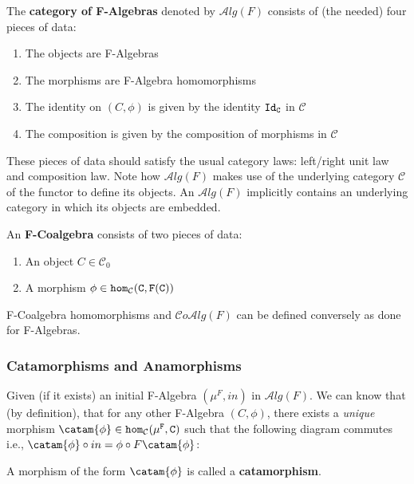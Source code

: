 \newcommand{\alg}[1]{\mathcal{A}lg(#1)}
\newcommand{\coalg}[1]{\mathcal{C}o\mathcal{A}lg(#1)}

The \textbf{category of F-Algebras} denoted by $\alg{F}$ consists of (the needed) four pieces of data:
\begin{enumerate}
    \item The objects are F-Algebras
    \item The morphisms are F-Algebra homomorphisms
    \item The identity on $(C,\phi)$ is given by the identity $\tt{Id}_C$ in $\mathcal{C}$
    \item The composition is given by the composition of morphisms in $\mathcal{C}$
\end{enumerate}
These pieces of data should satisfy the usual category laws: left/right unit law and composition law.
Note how $\alg{F}$ makes use of the underlying category $\mathcal{C}$ of the functor to define its objects.
An $\alg{F}$ implicitly contains an underlying category in which its objects are embedded.

An \textbf{F-Coalgebra} consists of two pieces of data:
\begin{enumerate}
    \item An object $C\in \mathcal{C}_0$
    \item A morphism $\phi\in\tt{hom}_\mathcal{C}(C,F(C))$
\end{enumerate}
F-Coalgebra homomorphisms and $\coalg{F}$ can be defined conversely as done for F-Algebras.

\subsubsection{Catamorphisms and Anamorphisms}
Given (if it exists) an initial F-Algebra $(\mu^F,in)$ in $\alg{F}$. We can know that (by definition), that for any other F-Algebra $(C,\phi)$, there exists a \textit{unique} morphism $\catam{\phi}\in\homm{C}{\mu^F,C}$ such that the following diagram commutes i.e., $\catam{\phi}\circ in = \phi\circ F\catam{\phi}$:
\begin{figure}[H]\vspace{-1em}\hfill
{}\hfill\null
\end{figure}\vspace{-1em}
A morphism of the form $\catam{\phi}$ is called a \textbf{catamorphism}.

